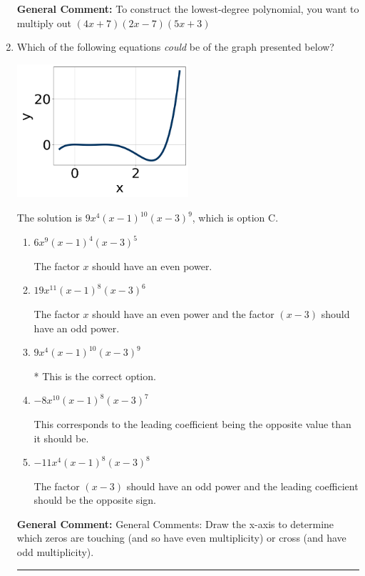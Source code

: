 \documentclass{extbook}[14pt]
\newcommand{\litem}[1]{\item #1

\rule{\textwidth}{0.4pt}}
\begin{document}
\begin{enumerate}
{\textbf{General Comment:} To construct the lowest-degree polynomial, you want to multiply out $(4x + 7)(2x -7)(5x + 3)$
}
\litem{
Which of the following equations \textit{could} be of the graph presented below?

\begin{center}
    \includegraphics[width=0.5\textwidth]{../Figures/polyGraphToFunctionC.png}
\end{center}


The solution is \( 9x^{4} (x - 1)^{10} (x - 3)^{9} \), which is option C.\begin{enumerate}[label=\Alph*.]
\item \( 6x^{9} (x - 1)^{4} (x - 3)^{5} \)

The factor $x$ should have an even power.
\item \( 19x^{11} (x - 1)^{8} (x - 3)^{6} \)

The factor $x$ should have an even power and the factor $(x - 3)$ should have an odd power.
\item \( 9x^{4} (x - 1)^{10} (x - 3)^{9} \)

* This is the correct option.
\item \( -8x^{10} (x - 1)^{8} (x - 3)^{7} \)

This corresponds to the leading coefficient being the opposite value than it should be.
\item \( -11x^{4} (x - 1)^{8} (x - 3)^{8} \)

The factor $(x - 3)$ should have an odd power and the leading coefficient should be the opposite sign.
\end{enumerate}

\textbf{General Comment:} General Comments: Draw the x-axis to determine which zeros are touching (and so have even multiplicity) or cross (and have odd multiplicity).
}
\end{enumerate}
\end{document}
